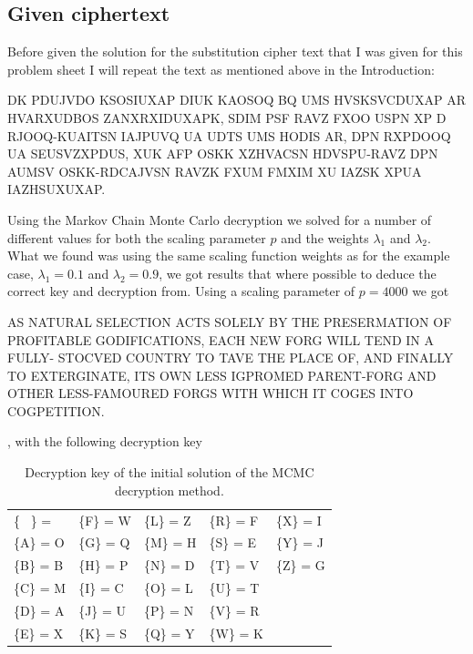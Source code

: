 \documentclass[a4paper, 11pt]{article}
\begin{document}
\subsection{Given ciphertext}

Before given the solution for the substitution cipher text that I was given
for this problem sheet I will repeat the text as mentioned above in the
Introduction:

\begin{adjustwidth}{1.5em}{0pt}
  \small
  DK PDUJVDO KSOSIUXAP DIUK KAOSOQ BQ UMS HVSKSVCDUXAP AR
  HVARXUDBOS ZANXRXIDUXAPK, SDIM PSF RAVZ FXOO USPN XP D RJOOQ-KUAITSN 
  IAJPUVQ UA UDTS UMS HODIS AR, DPN RXPDOOQ UA SEUSVZXPDUS, XUK
  AFP OSKK XZHVACSN HDVSPU-RAVZ DPN AUMSV OSKK-RDCAJVSN RAVZK FXUM
  FMXIM XU IAZSK XPUA IAZHSUXUXAP.
\end{adjustwidth}

Using the Markov Chain Monte Carlo decryption we solved for a number of
different values for both the scaling parameter $p$ and the weights 
$\lambda_1$ and $\lambda_2$. What we found was using the same scaling function
weights as for the example case, $\lambda_1 = 0.1$ and $\lambda_2 = 0.9$,
we got results that where possible to deduce the correct key and decryption
from. Using a scaling parameter of $p = 4000$ we got

\begin{adjustwidth}{1.5em}{0pt}
  \small
  AS NATURAL SELECTION ACTS SOLELY BY THE PRESERMATION OF
  PROFITABLE GODIFICATIONS, EACH NEW FORG WILL TEND IN A FULLY-
  STOCVED COUNTRY TO TAVE THE PLACE OF, AND FINALLY TO EXTERGINATE, ITS
  OWN LESS IGPROMED PARENT-FORG AND OTHER LESS-FAMOURED FORGS WITH
  WHICH IT COGES INTO COGPETITION.
\end{adjustwidth}

, with the following decryption key

\begin{table}[h]
  \centering
  \caption{Decryption key of the initial solution of the MCMC decryption 
  method.}
  \begin{tabular}{l l l l l}
  \{ \ \} =    &  \{F\} = W  &  \{L\} = Z  &  \{R\} = F  &  \{X\} = I  \\
  \{A\} = O  &  \{G\} = Q  &  \{M\} = H  &  \{S\} = E  &  \{Y\} = J  \\
  \{B\} = B  &  \{H\} = P  &  \{N\} = D  &  \{T\} = V  &  \{Z\} = G  \\
  \{C\} = M  &  \{I\} = C  &  \{O\} = L  &  \{U\} = T  &  \ \\
  \{D\} = A  &  \{J\} = U  &  \{P\} = N  &  \{V\} = R  &  \ \\
  \{E\} = X  &  \{K\} = S  &  \{Q\} = Y  &  \{W\} = K  &  \ \\
  \end{tabular}
  \label{tab:FirstKey}
\end{table}
\end{document}
